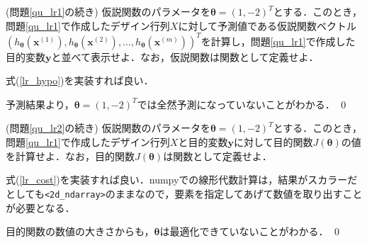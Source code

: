 \begin{qu}\label{qu_lr2}
(問題\ref{qu_lr1}の続き) 仮説関数のパラメータを$\bm{\theta}=(1,-2)^T$とする．このとき，問題\ref{qu_lr1}で作成したデザイン行列$X$に対して予測値である仮説関数ベクトル$(h_{{\bm \theta}}({\bm x}^{(1)}),h_{{\bm \theta}}({\bm x}^{(2)}),\ldots,h_{{\bm \theta}}({\bm x}^{(m)}))^T$を計算し，問題\ref{qu_lr1}で作成した目的変数${\bm y}$と並べて表示せよ．なお，仮説関数は関数として定義せよ．
\end{qu}
\begin{ans}
式(\ref{lr_hypo})を実装すれば良い．
\begin{cod}[\texttt{lr2.py}]　
}]{code/lr2.py}
\vspace{-10pt}
\begin{lstlisting}
y_df=
         y   y_pred
0  17.5920 -11.2202
1   9.1302 -10.0554
2  13.6620 -16.0372
3  11.8540 -13.0064
4   6.8233 -10.7196
\end{lstlisting}
\end{cod}
\vspace{-10pt}
予測結果より，$\bm{\theta}=(1,-2)^T$では全然予測になっていないことがわかる．
\qed
\end{ans}

\begin{qu}\label{qu_lr3}
(問題\ref{qu_lr2}の続き) 仮説関数のパラメータを$\bm{\theta}=(1,-2)^T$とする．このとき，問題\ref{qu_lr1}で作成したデザイン行列$X$と目的変数${\bm y}$に対して目的関数$J({\bm \theta})$の値を計算せよ．なお，目的関数$J({\bm \theta})$は関数として定義せよ．
\end{qu}
\begin{ans}
式(\ref{lr_cost})を実装すれば良い．numpyでの線形代数計算は，結果がスカラーだとしても\texttt{<2d\_ndarray>}のままなので，要素を指定してあげて数値を取り出すことが必要となる．
\begin{cod}[\texttt{lr3.py}]　
}]{code/lr3.py}
\vspace{-10pt}
\begin{lstlisting}
J=303.8795839611464
\end{lstlisting}
\end{cod}
\vspace{-10pt}
目的関数の数値の大きさからも，${\bm \theta}$は最適化できていないことがわかる．
\qed
\end{ans}

